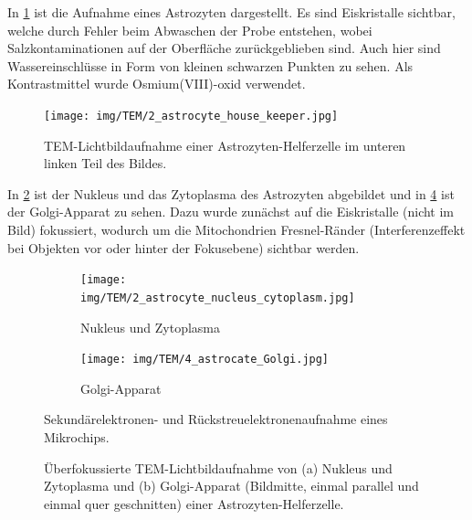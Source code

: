 In \cref{fig:tem:ahk} ist die Aufnahme eines Astrozyten dargestellt.
Es sind Eiskristalle sichtbar, welche durch Fehler beim Abwaschen der Probe entstehen, wobei Salzkontaminationen auf der Oberfläche zurückgeblieben sind.
Auch hier sind Wassereinschlüsse in Form von kleinen schwarzen Punkten zu sehen.
Als Kontrastmittel wurde Osmium(VIII)-oxid verwendet.

\begin{figure}[!ht]
    \centering
    \texttt{[image: img/TEM/2\_astrocyte\_house\_keeper.jpg]}
    \caption{TEM-Lichtbildaufnahme einer Astrozyten-Helferzelle im unteren linken Teil des Bildes.}
    \label{fig:tem:ahk}
\end{figure}

In \cref{fig:tem:anc} ist der Nukleus und das Zytoplasma des Astrozyten abgebildet und in \cref{fig:tem:golgi} ist der Golgi-Apparat zu sehen.
Dazu wurde zunächst auf die Eiskristalle (nicht im Bild) fokussiert, wodurch um die Mitochondrien Fresnel-Ränder (Interferenzeffekt bei Objekten vor oder hinter der Fokusebene) sichtbar werden.

\begin{figure}[!ht]
    \centering
    \begin{subfigure}{0.465\textwidth}
        \centering
        \texttt{[image: img/TEM/2\_astrocyte\_nucleus\_cytoplasm.jpg]}
        \caption{Nukleus und Zytoplasma}
        \label{fig:tem:anc}
    \end{subfigure}
    \hfill
    \begin{subfigure}{0.465\textwidth}
        \centering
        \texttt{[image: img/TEM/4\_astrocate\_Golgi.jpg]}
        \caption{Golgi-Apparat}
        \label{fig:tem:golgi}
    \end{subfigure}
    \caption{Sekundärelektronen- und Rückstreuelektronenaufnahme eines Mikrochips.}
    \caption{Überfokussierte TEM-Lichtbildaufnahme von (a) Nukleus und Zytoplasma und (b) Golgi-Apparat (Bildmitte, einmal parallel und einmal quer geschnitten) einer Astrozyten-Helferzelle.}
\end{figure}



